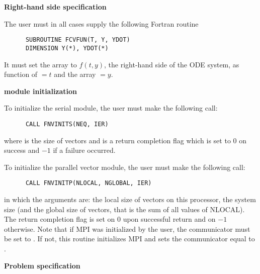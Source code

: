 \begin{Steps}
  
\item {\bf Right-hand side specification}
  
  The user must in all cases supply the following Fortran routine
\begin{verbatim}
      SUBROUTINE FCVFUN(T, Y, YDOT)
      DIMENSION Y(*), YDOT(*)
\end{verbatim}
  It must set the  array to $f(t,y)$, the right-hand side of the ODE
  system, as function of $=t$ and the array $=y$.  
  
\item  {\bf {\nvector} module initialization}

  {\s} To initialize the serial {\nvector} module, the user must make the
  following call:
\begin{verbatim}
      CALL FNVINITS(NEQ, IER)
\end{verbatim}
  where  is the size of vectors and
   is a  return completion flag which is set to $0$ on success and $-1$ 
  if a failure occurred.
  
  {\p} To initialize the parallel vector module, the user must make the
  following call:
\begin{verbatim}
      CALL FNVINITP(NLOCAL, NGLOBAL, IER)
\end{verbatim}
  in which the arguments are:  the local size of vectors on this
  processor,  the system size (and the global size of vectors, that
  is the sum of all values of NLOCAL). The return completion flag  is
  set on $0$ upon successful return and on $-1$ otherwise.
  Note that if MPI was initialized by the user, the communicator must be
  set to .  If not, this routine initializes MPI and sets
  the communicator equal to .
  
\item {\bf Problem specification}


\end{Steps}
